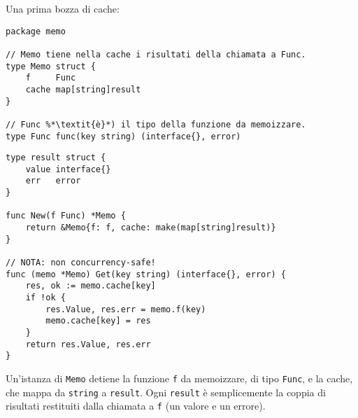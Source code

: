 \documentclass[../../thesis.tex]{subfiles}
\begin{document}
    Una prima bozza di cache:
    \begin{lstlisting}[frame = single, label = {lst:lstlisting9-7.2}]
package memo

// Memo tiene nella cache i risultati della chiamata a Func.
type Memo struct {
    f     Func
    cache map[string]result
}

// Func %*\textit{è}*) il tipo della funzione da memoizzare.
type Func func(key string) (interface{}, error)
    \end{lstlisting}
    \clearpage
    \newpage
    \begin{lstlisting}[frame = single, label = {lst:lstlisting9-7.3}]
type result struct {
    value interface{}
    err   error
}

func New(f Func) *Memo {
    return &Memo{f: f, cache: make(map[string]result)}
}

// NOTA: non concurrency-safe!
func (memo *Memo) Get(key string) (interface{}, error) {
    res, ok := memo.cache[key]
    if !ok {
        res.Value, res.err = memo.f(key)
        memo.cache[key] = res
    }
    return res.Value, res.err
}
    \end{lstlisting}
    Un'istanza di \verb"Memo" detiene la funzione \verb"f" da memoizzare, di tipo \verb"Func", e la cache, che mappa da \verb"string" a \verb"result".
    Ogni \verb"result" è semplicemente la coppia di risultati restituiti dalla chiamata a \verb"f" (un valore e un errore).
    \hfill \vspace{12pt}
\end{document}
